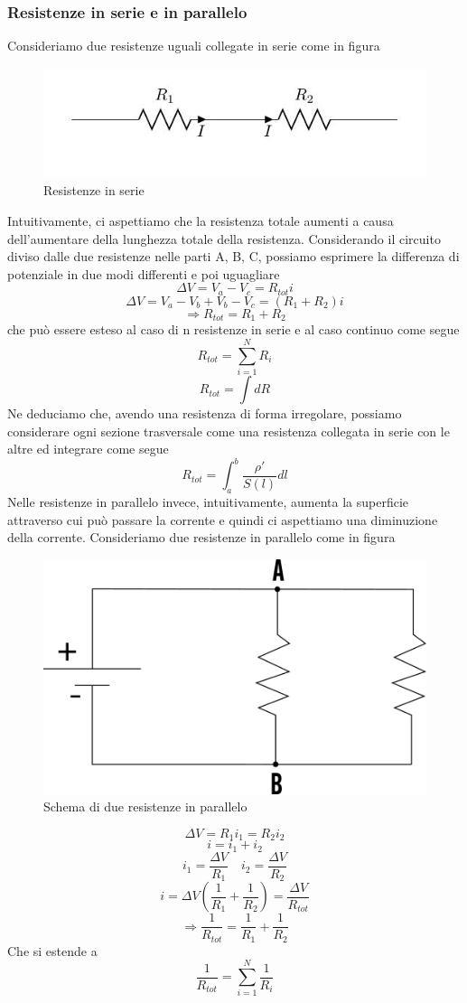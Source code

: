 \documentclass[
10pt, %
a4paper, %
oneside, %
headinclude,footinclude, %
BCOR5mm, %
]{scrartcl}
\begin{document}
\subsubsection*{Resistenze in serie e in parallelo}
Consideriamo due resistenze uguali collegate in serie come in figura
\begin{figure}[h!]
	\centering
	\includegraphics[width=0.6\linewidth]{../images/resistenze_serie}
	\caption{Resistenze in serie}
	\label{fig:resistenzeserie}
\end{figure}
\FloatBarrier
Intuitivamente, ci aspettiamo che la resistenza totale aumenti a causa dell'aumentare della lunghezza totale della resistenza. Considerando il circuito diviso dalle due resistenze nelle parti A, B, C, possiamo esprimere la differenza di potenziale in due modi differenti e poi uguagliare
\[\Delta V = V_a - V_c = R_{tot}i\]
\[\Delta V = V_a -V_b + V_b- V_c = (R_1 + R_2)i\]
\[\Rightarrow R_{tot} = R_1 + R_2\]
che può essere esteso al caso di n resistenze in serie e al caso continuo come segue
\[R_{tot} = \sum_{i=1}^N R_i \]
\[R_{tot} = \int dR\]
Ne deduciamo che, avendo una resistenza di forma irregolare, possiamo considerare ogni sezione trasversale come una resistenza collegata in serie con le altre ed integrare come segue
\[R_{tot}= \int_{a}^{b}\frac{\rho'}{S(l)}dl\]
Nelle resistenze in parallelo invece, intuitivamente, aumenta la superficie attraverso cui può passare la corrente e quindi ci aspettiamo una diminuzione della corrente. Consideriamo due resistenze in parallelo come in figura
\begin{figure}[h!]
	\centering
	\includegraphics[width=0.5\linewidth]{../images/resistenze_parallelo}
	\caption{Schema di due resistenze in parallelo}
	\label{fig:resistenzeparallelo}
\end{figure}
\FloatBarrier
\[\Delta V = R_1i_1= R_2i_2\]
\[i = i_1+i_2\]
\[i_1 = \frac{\Delta V}{R_1}\quad i_2 = \frac{\Delta V}{R_2} \]
\[ i = \Delta V \left(\frac{1}{R_1}+\frac{1}{R_2}\right)= \frac{\Delta V}{R_{tot}} \]
\[\Rightarrow \frac{1}{R_{tot}} = \frac{1}{R_1}+\frac{1}{R_2} \]
Che si estende a 
\[\frac{1}{R_{tot}}= \sum_{i = 1}^N\frac{1}{R_i}\]
\end{document}
